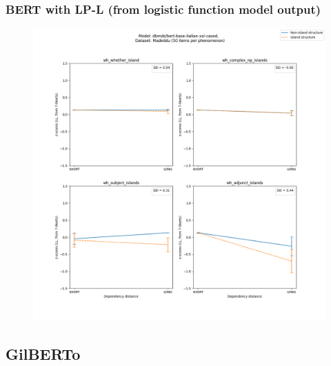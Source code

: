 \subsubsection{BERT with LP-L (from logistic function model output)}
\begin{figure}[h]
	\centering
	\includegraphics[width=1\textwidth]{images/Chapter1/Madeddu_wh_dbmdz_bert-base-italian-xxl-cased_LL-zscores-likert-2022-07-11.png} 
\end{figure}

\clearpage
\subsection{GilBERTo}

